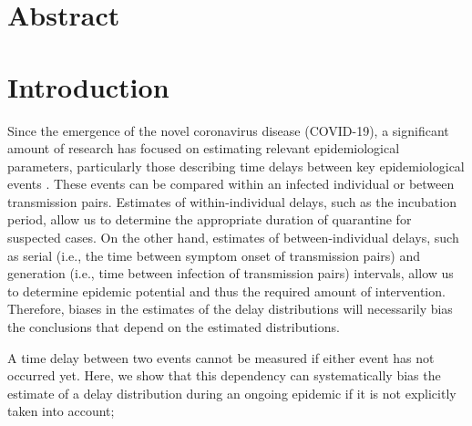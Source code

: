 \documentclass[12pt]{article}
\date{\today}
\begin{document}
\begin{flushleft}{
	\Large
	\textbf{}
}
\end{flushleft}

\section*{Abstract}

\pagebreak

\section{Introduction}

Since the emergence of the novel coronavirus disease (COVID-19), a significant amount of research has focused on estimating relevant epidemiological parameters, particularly those describing time delays between key epidemiological events \citep{backer2020incubation, du2020serial, ganyani2020estimating, lauer2020incubation, li2020early, linton2020incubation, nishiura2020serial, tian2020characteristics, zhao2020estimating}.
These events can be compared within an infected individual or between transmission pairs.
Estimates of within-individual delays, such as the incubation period, allow us to determine the appropriate duration of quarantine for suspected cases.
On the other hand, estimates of between-individual delays, such as serial (i.e., the time between symptom onset of transmission pairs) and generation (i.e., time between infection of transmission pairs) intervals, allow us to determine epidemic potential and thus the required amount of intervention.
Therefore, biases in the estimates of the delay distributions will necessarily bias the conclusions that depend on the estimated distributions.

A time delay between two events cannot be measured if either event has not occurred yet.
Here, we show that this dependency can systematically bias the estimate of a delay distribution during an ongoing epidemic if it is not explicitly taken into account;
\end{document}
